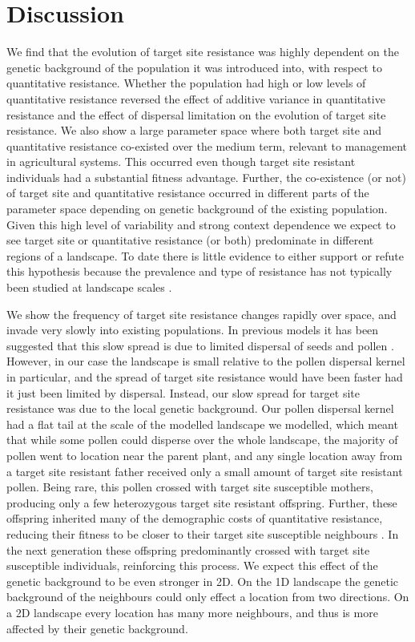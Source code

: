 \documentclass[10pt,letterpaper]{article}
\begin{document}
\section*{Discussion}
We find that the evolution of target site resistance was highly dependent on the genetic background of the population it was introduced into, with respect to quantitative resistance. Whether the population had high or low levels of quantitative resistance reversed the effect of additive variance in  quantitative resistance and the effect of dispersal limitation on the evolution of target site resistance. We also show a large parameter space where both target site and quantitative resistance co-existed over the medium term, relevant to management in agricultural systems. This occurred even though target site resistant individuals had a substantial fitness advantage. Further, the co-existence (or not) of target site and quantitative resistance occurred in different parts of the parameter space depending on genetic background of the existing population. Given this high level of variability and strong context dependence we expect to see target site or quantitative resistance (or both) predominate in different regions of a landscape. To date there is little evidence to either support or refute this hypothesis because the prevalence and type of resistance has not typically been studied at landscape scales \cite{Dely2013}.

We show the frequency of target site resistance changes rapidly over space, and invade very slowly into existing populations. In previous models it has been suggested that this slow spread is due to limited dispersal of seeds and pollen \cite{Some2017}. However, in our case the landscape is small relative to the pollen dispersal kernel in particular, and the spread of target site resistance would have been faster had it just been limited by dispersal. Instead, our slow spread for target site resistance was due to the local genetic background. Our pollen dispersal kernel had a flat tail at the scale of the modelled landscape we modelled, which meant that while some pollen could disperse over the whole landscape, the majority of pollen went to location near the parent plant, and any single location away from a target site resistant father received only a small amount of target site resistant pollen. Being rare, this pollen crossed with target site susceptible mothers, producing only a few heterozygous target site resistant offspring. Further, these offspring inherited many of the demographic costs of quantitative resistance, reducing their fitness to be closer to their target site susceptible neighbours \cite{Chev2008}. In the next generation these offspring predominantly crossed with target site susceptible individuals, reinforcing this process. We expect this effect of the genetic background to be even stronger in 2D. On the 1D landscape the genetic background of the neighbours could only effect a location from two directions. On a 2D landscape every location has many more neighbours, and thus is more affected by their genetic background.	                
\end{document}
